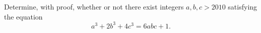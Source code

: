 Determine, with proof, whether or not there exist integers $a,b,c>2010$ satisfying the equation \[a^3+2b^3+4c^3=6abc+1.\]